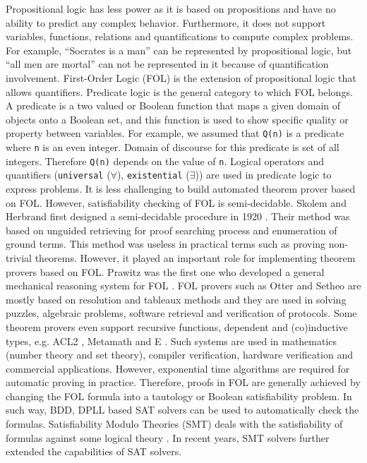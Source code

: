 Propositional logic has less power as it is based on propositions and have no ability to predict any complex behavior.
Furthermore, it does not support variables, functions, relations and quantifications to compute complex problems. 
For example, ``Socrates is a man'' can be represented by propositional logic, but ``all men are mortal'' can not be 
represented in it because of quantification involvement. First-Order Logic (FOL) is the 
extension of propositional logic that allows quantifiers. Predicate logic is the general category to which FOL belongs. A predicate is a two 
valued or Boolean function that maps a given domain of objects onto a Boolean set, and this function is used to show specific quality or property 
between variables. For example, we assumed that \texttt{Q(n)} is a predicate where \texttt{n} is an even integer. Domain of discourse 
for this predicate is set of all integers. Therefore \texttt{Q(n)} depends on the value of \texttt{n}.  
Logical operators and quantifiers (\texttt{universal} ($\forall$), \texttt{existential} ($\exists$)) are used in predicate logic to express 
problems. It is less challenging to build automated theorem prover based on FOL. However, satisfiability checking of FOL is 
semi-decidable. Skolem and Herbrand first designed a semi-decidable procedure in 1920 . Their method
was based on unguided retrieving for proof searching process and enumeration of ground terms. This method was useless in practical terms such as
proving non-trivial theorems. However, it played an important role for implementing theorem provers based on FOL. 
Prawitz was the first one who developed a general mechanical reasoning system for FOL .
FOL provers such as Otter  and Setheo  are mostly based on resolution and tableaux methods and they are used in 
solving puzzles, algebraic problems, software retrieval and verification of protocols. Some theorem provers even support recursive functions,
dependent and (co)inductive types, e.g. ACL2 , Metamath  and E . 
Such systems are used in mathematics (number theory and set theory), compiler verification, hardware verification and commercial applications.
However, exponential time algorithms are required for 
automatic proving in practice. Therefore, proofs in FOL are generally achieved by changing the FOL formula into a tautology 
or Boolean satisfiability problem. In such way, BDD, DPLL based SAT solvers can be used to automatically check the 
formulas. Satisfiability Modulo Theories (SMT) deals with the satisfiability of formulas against some logical theory .
In recent years, SMT solvers further extended the capabilities of SAT solvers.

